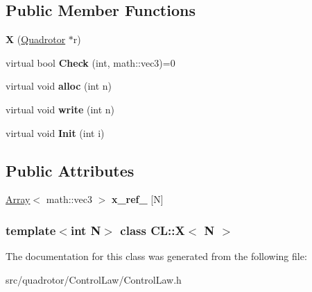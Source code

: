 \subsection*{\-Public \-Member \-Functions}
\begin{DoxyCompactItemize}
\item 
\hypertarget{classCL_1_1X_ac0df118e23cb6f9fd151c295f20b5dc7}{{\bfseries \-X} (\hyperlink{classQuadrotor}{\-Quadrotor} $\ast$r)}\label{classCL_1_1X_ac0df118e23cb6f9fd151c295f20b5dc7}

\item 
\hypertarget{classCL_1_1X_aa1a6d63850e96205aead2cf514646b82}{virtual bool {\bfseries \-Check} (int, math\-::vec3)=0}\label{classCL_1_1X_aa1a6d63850e96205aead2cf514646b82}

\item 
\hypertarget{classCL_1_1X_a54020da1e162b1813e86d4bf919c4da3}{virtual void {\bfseries alloc} (int n)}\label{classCL_1_1X_a54020da1e162b1813e86d4bf919c4da3}

\item 
\hypertarget{classCL_1_1X_a7f4029b18e5f19adb12c27aac2210977}{virtual void {\bfseries write} (int n)}\label{classCL_1_1X_a7f4029b18e5f19adb12c27aac2210977}

\item 
\hypertarget{classCL_1_1X_a31783ad77e8fe3aca841633c84c396b4}{virtual void {\bfseries \-Init} (int i)}\label{classCL_1_1X_a31783ad77e8fe3aca841633c84c396b4}

\end{DoxyCompactItemize}
\subsection*{\-Public \-Attributes}
\begin{DoxyCompactItemize}
\item 
\hypertarget{classCL_1_1X_ae8cca322585bd7d858fb1408ad6d1f72}{\hyperlink{classArray}{\-Array}$<$ math\-::vec3 $>$ {\bfseries x\-\_\-ref\-\_\-} \mbox{[}\-N\mbox{]}}\label{classCL_1_1X_ae8cca322585bd7d858fb1408ad6d1f72}

\end{DoxyCompactItemize}
\subsubsection*{template$<$int \-N$>$ class C\-L\-::\-X$<$ N $>$}



\-The documentation for this class was generated from the following file\-:\begin{DoxyCompactItemize}
\item 
src/quadrotor/\-Control\-Law/\-Control\-Law.\-h\end{DoxyCompactItemize}
